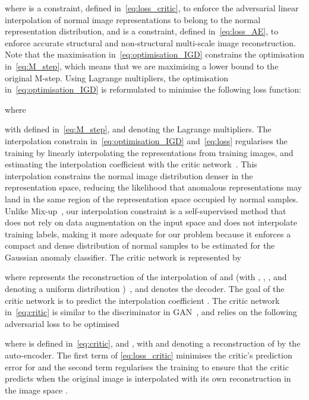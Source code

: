 \documentclass[letterpaper]{article} \usepackage{aaai22}  \usepackage{times}  \usepackage{helvet}  \usepackage{courier}  \usepackage[hyphens]{url}  \usepackage{graphicx} \urlstyle{rm} \def\UrlFont{\rm}  \usepackage{natbib}  \usepackage{caption} \DeclareCaptionStyle{ruled}{labelfont=normalfont,labelsep=colon,strut=off} \frenchspacing  \setlength{\pdfpagewidth}{8.5in}  \setlength{\pdfpageheight}{11in}  \usepackage{algorithm}
\begin{document}
where  is a constraint, defined in~\eqref{eq:loss_critic}, to enforce the adversarial linear interpolation of normal image representations to belong to the normal representation distribution, and  is a constraint, defined in~\eqref{eq:loss_AE}, to enforce accurate structural and non-structural multi-scale image reconstruction.
Note that the maximisation in~\eqref{eq:optimisation_IGD} constrains the optimisation in~\eqref{eq:M_step}, which means that we are maximising a lower bound to the original M-step. Using Lagrange multipliers, the optimisation in~\eqref{eq:optimisation_IGD} is reformulated to minimise the following loss function:

where 
  
with  defined in~\eqref{eq:M_step}, and  denoting the Lagrange multipliers.
The interpolation constrain  in~\eqref{eq:optimisation_IGD} and~\eqref{eq:loss} regularises the  training by linearly interpolating the  representations from training images, and estimating the interpolation coefficient with the critic network~\cite{berthelot2018understanding}.
This interpolation constrains
 the normal image distribution denser in the representation space, reducing the likelihood that anomalous representations may land in the same region of the representation space occupied by normal samples.
Unlike Mix-up~\cite{zhang2017mixup}, our interpolation constraint is a self-supervised method that does not rely on data augmentation on the input space and does not interpolate training labels, making it more adequate for our problem because it enforces a compact and dense distribution of normal samples to be estimated for the Gaussian anomaly classifier. 
The critic network is represented by

where  
represents the reconstruction of the interpolation of  and  (with , ,  , and  denoting a uniform distribution )~\cite{berthelot2018understanding}, and  denotes the decoder. The goal of the critic network  is to predict the interpolation coefficient . 
The critic network in~\eqref{eq:critic} is similar to the discriminator in GAN~\cite{gan}, and relies on the following adversarial loss to be optimised~\cite{berthelot2018understanding}

where 
 is defined in~\eqref{eq:critic}, and
, with 
and  denoting a reconstruction of  by the auto-encoder.
The first term of \eqref{eq:loss_critic} minimises the critic's prediction error for  and the second term regularises the training to ensure that the critic predicts  when the original image is interpolated with its own reconstruction in the image space . 
\end{document}
